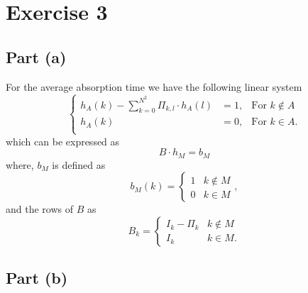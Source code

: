 \section{Exercise 3}

\subsection*{Part (a)}

For the average absorption time we have the following linear system
\[ \left\{\begin{array}{ccl}
    h_A(k) - \sum_{k = 0}^{N^2} \Pi_{k,l} \cdot h_A(l)  & = 1, & \mbox{For }k \not\in A\\
    h_A(k) & = 0, & \mbox{For }k \in A.\\
\end{array}\right. \]
which can be expressed as
\[ B\cdot h_M = b_M \]
where, $b_M$ is defined as
\[ b_M(k) = \begin{cases}
    1 & k \not\in M\\
    0 & k\in M
\end{cases}, \]
and the rows of $B$ as
\[ B_k = \begin{cases}
    I_k - \Pi_k & k \not\in M\\
    I_k & k \in M.
\end{cases} \]

\subsection*{Part (b)}

